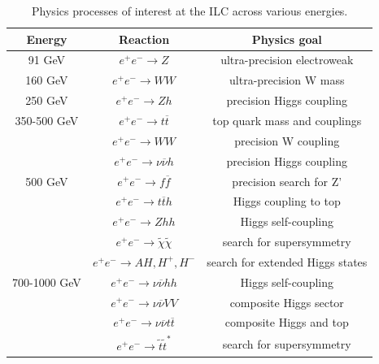 
\begin{table}[h]
\centering
	\begin{tabular}{ c | c | c }
	\hline \hline
	\textbf{Energy} & \textbf{Reaction} & \textbf{Physics goal} \\ \hline
	 91 GeV & $e^+ e^- \rightarrow Z$ & ultra-precision electroweak \\ \hline
	 160 GeV & $e^+ e^- \rightarrow WW$ & ultra-precision W mass \\ \hline
	 250 GeV & $e^+ e^- \rightarrow Zh$ & precision Higgs coupling \\ \hline
	 350-500 GeV & $e^+ e^- \rightarrow t\overline{t}$ & top quark mass and couplings \\
	   & $e^+ e^- \rightarrow WW$ & precision W coupling \\
	   & $e^+ e^- \rightarrow \nu \overline{\nu} h$ & precision Higgs coupling \\ \hline
	 500 GeV & $e^+ e^- \rightarrow f \overline{f}$ & precision search for Z' \\
	   & $e^+ e^- \rightarrow t \overline{t}h$ & Higgs coupling to top \\
	   & $e^+ e^- \rightarrow Zhh$ & Higgs self-coupling \\
	   & $e^+ e^- \rightarrow \widetilde{\chi} \widetilde{\chi}$ & search for supersymmetry \\
	   & $e^+ e^- \rightarrow AH, H^+, H^-$ & search for extended Higgs states \\ \hline
	 700-1000 GeV & $e^+ e^- \rightarrow \nu \overline{\nu} hh$ & Higgs self-coupling \\
	   & $e^+ e^- \rightarrow \nu \overline{\nu} VV$ & composite Higgs sector \\
	   & $e^+ e^- \rightarrow  \nu \overline{\nu} t \overline{t}$ & composite Higgs and top \\
	   & $e^+ e^- \rightarrow \tilde{t} \tilde{t}^*$ & search for supersymmetry \\ \hline
	\end{tabular}
	\caption{Physics processes of interest at the ILC across various energies.}
	\label{table:colliders/physics-goals}
\end{table}


